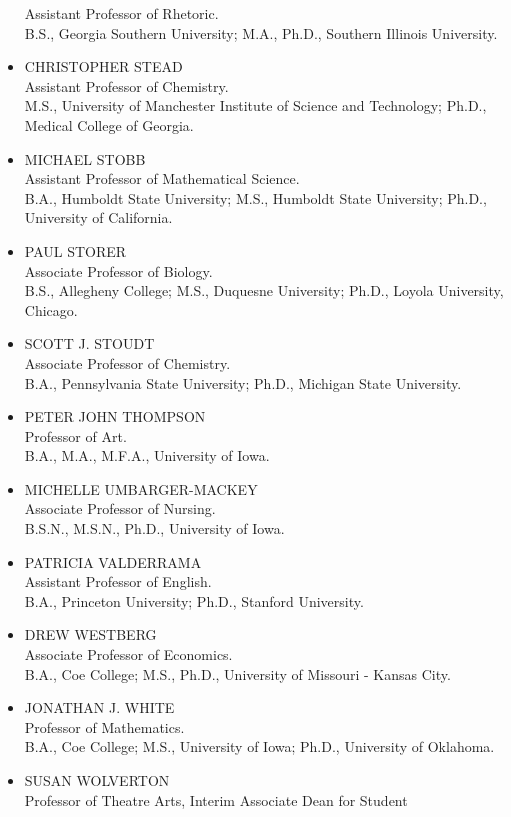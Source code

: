 \documentclass[
  letterpaper,
]{scrbook}
\begin{document}
\begin{itemize}
  Assistant Professor of Rhetoric.\\
  B.S., Georgia Southern University; M.A., Ph.D., Southern Illinois
  University.
\item
  CHRISTOPHER STEAD\\
  Assistant Professor of Chemistry.\\
  M.S., University of Manchester Institute of Science and Technology;
  Ph.D., Medical College of Georgia.
\item
  MICHAEL STOBB\\
  Assistant Professor of Mathematical Science.\\
  B.A., Humboldt State University; M.S., Humboldt State University;
  Ph.D., University of California.
\item
  PAUL STORER\\
  Associate Professor of Biology.\\
  B.S., Allegheny College; M.S., Duquesne University; Ph.D., Loyola
  University, Chicago.
\item
  SCOTT J. STOUDT\\
  Associate Professor of Chemistry.\\
  B.A., Pennsylvania State University; Ph.D., Michigan State University.
\item
  PETER JOHN THOMPSON\\
  Professor of Art.\\
  B.A., M.A., M.F.A., University of Iowa.
\item
  MICHELLE UMBARGER-MACKEY\\
  Associate Professor of Nursing.\\
  B.S.N., M.S.N., Ph.D., University of Iowa.
\item
  PATRICIA VALDERRAMA\\
  Assistant Professor of English.\\
  B.A., Princeton University; Ph.D., Stanford University.
\item
  DREW WESTBERG\\
  Associate Professor of Economics.\\
  B.A., Coe College; M.S., Ph.D., University of Missouri - Kansas City.
\item
  JONATHAN J. WHITE\\
  Professor of Mathematics.\\
  B.A., Coe College; M.S., University of Iowa; Ph.D., University of
  Oklahoma.
\item
  SUSAN WOLVERTON\\
  Professor of Theatre Arts, Interim Associate Dean for Student

\end{itemize}
\end{document}
